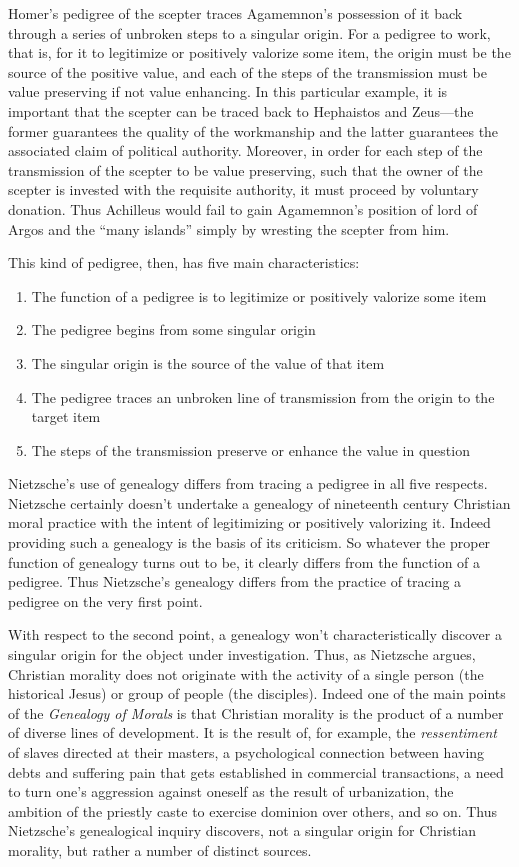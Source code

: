 Homer's pedigree of the scepter traces Agamemnon's possession of it back through a series of unbroken steps to a singular origin. For a pedigree to work, that is, for it to legitimize or positively valorize some item, the origin must be the source of the positive value, and each of the steps of the transmission must be value preserving if not value enhancing. In this particular example, it is important that the scepter can be traced back to Hephaistos and Zeus---the former guarantees the quality of the workmanship and the latter guarantees the associated claim of political authority. Moreover, in order for each step of the transmission of the scepter to be value preserving, such that the owner of the scepter is invested with the requisite authority, it must proceed by voluntary donation. Thus Achilleus would fail to gain Agamemnon's position of lord of Argos and the ``many islands'' simply by wresting the scepter from him.

This kind of pedigree, then, has five main characteristics:
\begin{enumerate}
    \item The function of a pedigree is to legitimize or positively valorize some item
    \item The pedigree begins from some singular origin
    \item The singular origin is the source of the value of that item
    \item The pedigree traces an unbroken line of transmission from the origin to the target item
    \item The steps of the transmission preserve or enhance the value in question
\end{enumerate}

Nietzsche's use of genealogy differs from tracing a pedigree in all five respects. Nietzsche certainly doesn't undertake a genealogy of nineteenth century Christian moral practice with the intent of legitimizing or positively valorizing it. Indeed providing such a genealogy is the basis of its criticism. So whatever the proper function of genealogy turns out to be, it clearly differs from the function of a pedigree. Thus Nietzsche's genealogy differs from the practice of tracing a pedigree on the very first point.

With respect to the second point, a genealogy won't characteristically discover a singular origin for the object under investigation. Thus, as Nietzsche argues, Christian morality does not originate with the activity of a single person (the historical Jesus) or group of people (the disciples). Indeed one of the main points of the \emph{Genealogy of Morals} is that Christian morality is the product of a number of diverse lines of development. It is the result of, for example, the \emph{ressentiment} of slaves directed at their masters, a psychological connection between having debts and suffering pain that gets established in commercial transactions, a need to turn one's aggression against oneself as the result of urbanization, the ambition of the priestly caste to exercise dominion over others, and so on. Thus Nietzsche's genealogical inquiry discovers, not a singular origin for Christian morality, but rather a number of distinct sources.

